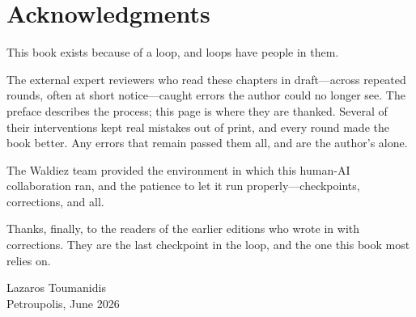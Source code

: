 \chapter*{Acknowledgments}

This book exists because of a loop, and loops have people in them.

The external expert reviewers who read these chapters in draft---across repeated rounds, often at short notice---caught errors the author could no longer see. The preface describes the process; this page is where they are thanked. Several of their interventions kept real mistakes out of print, and every round made the book better. Any errors that remain passed them all, and are the author's alone.

The Waldiez team provided the environment in which this human-AI collaboration ran, and the patience to let it run properly---checkpoints, corrections, and all.

Thanks, finally, to the readers of the earlier editions who wrote in with corrections. They are the last checkpoint in the loop, and the one this book most relies on.

\bigskip
\noindent
Lazaros Toumanidis\\
Petroupolis, June 2026
